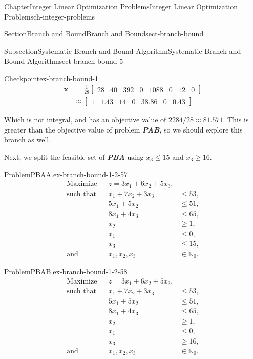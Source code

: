 \documentclass[oneside,10pt,]{book}
\newcommand{\alert}[1]{\textbf{\textit{#1}}}
\numberwithin{equation}{section}
\newcommand{\amp}{&}
\begin{document}
\begin{chapterptx}{Chapter}{Integer Linear Optimization Problems}{}{Integer Linear Optimization Problems}{}{}{ch-integer-problems}
\begin{sectionptx}{Section}{Branch and Bound}{}{Branch and Bound}{}{}{sect-branch-bound}
\begin{subsectionptx}{Subsection}{Systematic Branch and Bound Algorithm}{}{Systematic Branch and Bound Algorithm}{}{}{sect-branch-bound-5}
\begin{inlineexercise}{Checkpoint}{}{ex-branch-bound-1}
\begin{equation*}
\begin{aligned} \boldsymbol{x} \amp = \frac{1}{28} \left[\begin{array}{rrr|rrrrr} 28 \amp 40 \amp 392 \amp 0 \amp 1088 \amp 0 \amp 12 \amp 0 \end{array}\right] \\ \amp \approx \left[\begin{array}{rrr|rrrr} 1 \amp 1.43 \amp 14 \amp 0 \amp 38.86 \amp 0 \amp 0.43 \end{array}\right] \end{aligned}
\end{equation*}
%
\par
Which is not integral, and has an objective value of \(2284/28\approx 81.571\). This is greater than the objective value of problem \alert{PAB}, so we should explore this branch as well.%
\par
Next, we split the feasible set of \alert{PBA} using \(x_3 \leq 15\) and \(x_3 \geq 16\).%
\begin{problem}{Problem}{PBAA.}{ex-branch-bound-1-2-57}%
%
\begin{equation*}
\begin{aligned} \text{Maximize} \amp\amp z = 3x_1 +6x_2 + 5 x_3, \amp\\ \text{such that} \amp\amp x_1 + 7 x_2 + 3x_3 \amp \leq 53, \\ \amp\amp 5 x_1 + 5 x_2 \amp \leq 51, \\ \amp\amp 8 x_1 + 4x_3 \amp \leq 65, \\ \amp\amp x_2 \amp \geq 1, \\ \amp\amp x_1 \amp \leq 0, \\ \amp \amp x_3 \amp \leq 15, \\ \text{and} \amp\amp x_1, x_2, x_3 \amp \in \mathbb{N}_{0}.
\end{aligned}
\end{equation*}
%
\end{problem}
\begin{problem}{Problem}{PBAB.}{ex-branch-bound-1-2-58}%
%
\begin{equation*}
\begin{aligned} \text{Maximize} \amp\amp z = 3x_1 +6x_2 + 5 x_3, \amp\\ \text{such that} \amp\amp x_1 + 7 x_2 + 3x_3 \amp \leq 53, \\ \amp\amp 5 x_1 + 5 x_2 \amp \leq 51, \\ \amp\amp 8 x_1 + 4x_3 \amp \leq 65, \\ \amp\amp x_2 \amp \geq 1, \\ \amp\amp x_1 \amp \leq 0, \\ \amp \amp x_3 \amp \geq 16, \\ \text{and} \amp\amp x_1, x_2, x_3 \amp \in \mathbb{N}_{0}.

\end{aligned}
\end{equation*}
\end{problem}
\end{inlineexercise}
\end{subsectionptx}
\end{sectionptx}
\end{chapterptx}
\end{document}
